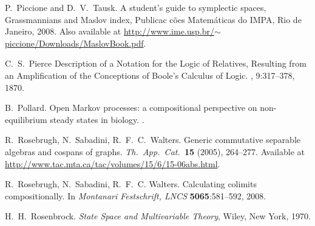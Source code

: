 \begin{thebibliography}{RSW00}

    P.\ Piccione and D.\ V.\ Tausk.
    \newblock A student's guide to symplectic
    spaces, Grassmannians and Maslov index, Publicac c\~oes Matem\'aticas do
    IMPA, Rio de Janeiro, 2008.
    \newblock Also available at
    \href{http://www.ime.usp.br/~piccione/Downloads/MaslovBook.pdf}
    {http://www.ime.usp.br/$\sim$piccione/Downloads/MaslovBook.pdf}.

    C.\ S.\ Pierce
    \newblock Description of a Notation for the Logic of Relatives, Resulting
    from an Amplification of the Conceptions of Boole's Calculus of Logic.
    ,
    9:317--378, 1870. 


    B.\ Pollard.
    \newblock Open Markov processes: a compositional
    perspective on non-equilibrium steady states in biology.
    .

    R.\ Rosebrugh, N.\ Sabadini, R.\ F.\ C.\ Walters.
    \newblock Generic
    commutative separable algebras and cospans of graphs.
    \newblock \textsl{Th.\ App.\
    Cat.\ }\textbf{15} (2005), 264--277.
    \newblock Available at
    \href{http://www.tac.mta.ca/tac/volumes/15/6/15-06abs.html}{http://www.tac.mta.ca/tac/volumes/15/6/15-06abs.html}.

    R.\ Rosebrugh, N.\ Sabadini, R.\ F.\ C. Walters.
    \newblock Calculating
    colimits compositionally.
    \newblock In \emph{Montanari Festschrift, LNCS} {\bf 5065}:581--592, 2008.

    H.\ H.\ Rosenbrock.
    \newblock \emph{State Space and Multivariable Theory},
    Wiley, New York, 1970. 



\end{thebibliography}
